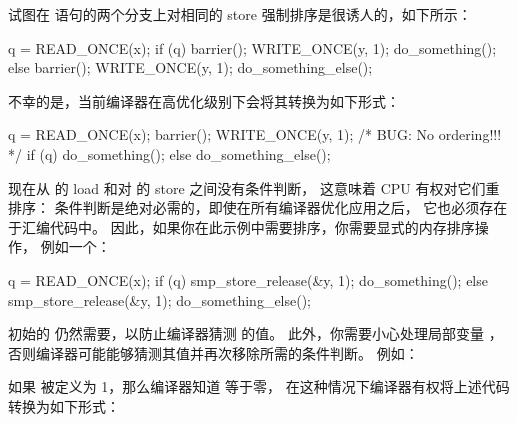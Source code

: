 \QuickQuizEnd

试图在  语句的两个分支上对相同的 store 强制排序是很诱人的，如下所示：

\begin{VerbatimN}
q = READ_ONCE(x);
if (q) {
	barrier();
	WRITE_ONCE(y, 1);
	do_something();
} else {
	barrier();
	WRITE_ONCE(y, 1);
	do_something_else();
}
\end{VerbatimN}

不幸的是，当前编译器在高优化级别下会将其转换为如下形式：

\begin{VerbatimN}
q = READ_ONCE(x);
barrier();
WRITE_ONCE(y, 1);  /* BUG: No ordering!!! */
if (q)
	do_something();
else
	do_something_else();
\end{VerbatimN}

现在从  的 load 和对  的 store 之间没有条件判断，
这意味着 CPU 有权对它们重排序：
条件判断是绝对必需的，即使在所有编译器优化应用之后，
它也必须存在于汇编代码中。
因此，如果你在此示例中需要排序，你需要显式的内存排序操作，
例如一个：

\begin{VerbatimN}
q = READ_ONCE(x);
if (q) {
	smp_store_release(&y, 1);
	do_something();
} else {
	smp_store_release(&y, 1);
	do_something_else();
}
\end{VerbatimN}

初始的  仍然需要，以防止编译器猜测  的值。
此外，你需要小心处理局部变量 ，
否则编译器可能能够猜测其值并再次移除所需的条件判断。
例如：


如果  被定义为 1，那么编译器知道  等于零，
在这种情况下编译器有权将上述代码转换为如下形式：

